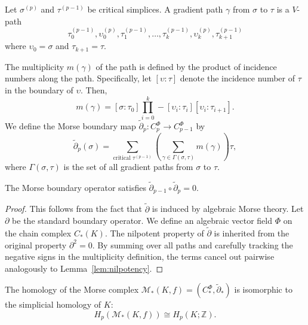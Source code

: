 \begin{definition}
Let $\sigma^{(p)}$ and $\tau^{(p-1)}$ be critical simplices. A gradient path $\gamma$ from $\sigma$ to $\tau$ is a $V$-path
\[ \tau_0^{(p-1)}, \upsilon_0^{(p)}, \tau_1^{(p-1)}, \dots, \tau_k^{(p-1)}, \upsilon_k^{(p)}, \tau_{k+1}^{(p-1)} \]
where $\upsilon_0 = \sigma$ and $\tau_{k+1} = \tau$. 

The multiplicity $m(\gamma)$ of the path is defined by the product of incidence numbers along the path. Specifically, let $[\upsilon : \tau]$ denote the incidence number of $\tau$ in the boundary of $\upsilon$. Then,
\[ m(\gamma) = [\sigma : \tau_0] \prod_{i=0}^k -[\upsilon_i : \tau_i] [\upsilon_i : \tau_{i+1}]. \]
We define the Morse boundary map $\tilde{\partial}_p : C_p^\Phi \to C_{p-1}^\Phi$ by
\[ \tilde{\partial}_p(\sigma) = \sum_{\text{critical } \tau^{(p-1)}} \left( \sum_{\gamma \in \Gamma(\sigma, \tau)} m(\gamma) \right) \tau, \]
where $\Gamma(\sigma, \tau)$ is the set of all gradient paths from $\sigma$ to $\tau$.
\end{definition}

\begin{lemma}
\label{lem:morse_boundary_nilpotent}
The Morse boundary operator satisfies $\tilde{\partial}_{p-1} \circ \tilde{\partial}_p = 0$.
\end{lemma}

\begin{proof}
This follows from the fact that $\tilde{\partial}$ is induced by algebraic Morse theory. Let $\partial$ be the standard boundary operator. We define an algebraic vector field $\Phi$ on the chain complex $C_*(K)$. The nilpotent property of $\tilde{\partial}$ is inherited from the original property $\partial^2 = 0$. By summing over all paths and carefully tracking the negative signs in the multiplicity definition, the terms cancel out pairwise analogously to Lemma~\ref{lem:nilpotency}.
\end{proof}

\begin{theorem}
\label{thm:iso_homology}
The homology of the Morse complex $\mathcal{M}_*(K, f) = (C_*^\Phi, \tilde{\partial}_*)$ is isomorphic to the simplicial homology of $K$:
\[ H_p(\mathcal{M}_*(K, f)) \cong H_p(K; \mathbb{Z}). \]
\end{theorem}

